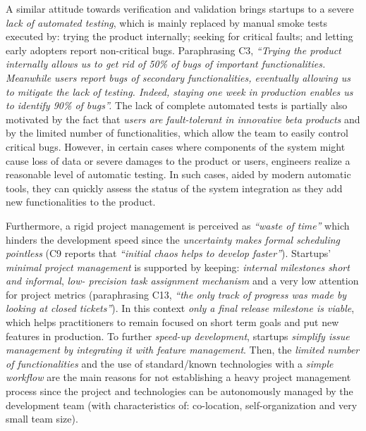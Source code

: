 \documentclass[10pt,journal,letterpaper,compsoc]{IEEEtran}
\begin{document}
A similar attitude towards verification and validation brings startups to a
severe \textit{lack of automated testing}, which is mainly replaced by manual
smoke tests executed by: trying the product internally; seeking for critical
faults; and letting early adopters report non-critical bugs. Paraphrasing C3,
\textit{``Trying the product internally allows us to get rid of 50\% of bugs of
important functionalities. Meanwhile users report bugs of secondary
functionalities, eventually allowing us to mitigate the lack of testing. Indeed,
staying one week in production enables us to identify 90\% of bugs''.} The lack
of complete automated tests is partially also motivated by the fact that
\textit{users are fault-tolerant in innovative beta products} and by the
limited number of functionalities, which allow the team to easily control
critical bugs. However, in certain cases where components of the system might
cause loss of data or severe damages to the product or users, engineers realize
a reasonable level of automatic testing. In such cases, aided by modern
automatic tools, they can quickly assess the status of the system integration as
they add new functionalities to the product.

Furthermore, a rigid project management is perceived as \textit{``waste of
time''} which hinders the development speed since the \textit{uncertainty makes
formal scheduling pointless} (C9 reports that \textit{``initial chaos helps to
develop faster''}). Startups' \textit{minimal project management} is supported
by keeping: \textit{internal milestones short and informal}, \textit{low-
precision task assignment mechanism} and a very low attention for project
metrics (paraphrasing C13, \textit{``the only track of progress was made by
looking at closed tickets''}). In this context \textit{only a final release
milestone is viable}, which helps practitioners to remain focused on short term
goals and put new features in production. To further \textit{speed-up
development}, startups \textit{simplify issue management by integrating it with
feature management}. Then, the \textit{limited number of functionalities} and
the {use of standard/known technologies} with a \textit{simple workflow} are the
main reasons for not establishing a heavy project management process since the
project and technologies can be autonomously managed by the development team
(with characteristics of: co-location, self-organization and very small team
size).  %
\end{document}

